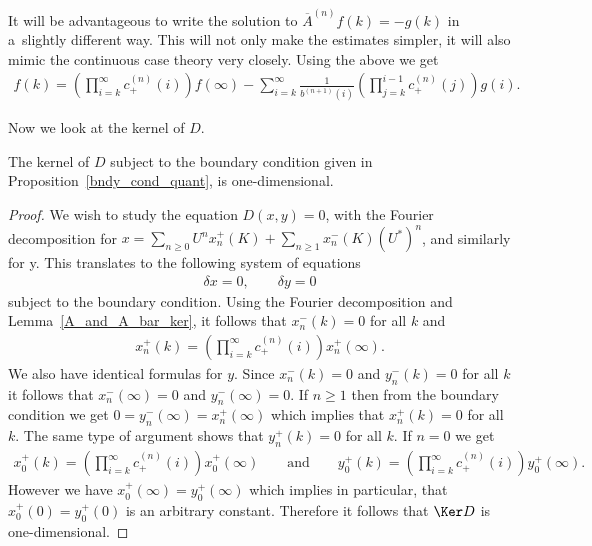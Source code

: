 It will be advantageous to write the solution to $\overline{A}^{(n)}f(k) = -g(k)$ in a~slightly dif\/ferent way.
This will not only make the estimates simpler, it will also mimic the continuous case theory very closely.
Using the above we get
\begin{gather*}
f(k) = \left(\prod\limits_{i=k}^\infty c_+^{(n)}(i)\right)f(\infty) - \sum\limits_{i=k}^\infty
\frac{1}{b^{(n+1)}(i)}\left(\prod\limits_{j=k}^{i-1}c_+^{(n)}(j)\right)g(i).
\end{gather*}

Now we look at the kernel of $D$.

\begin{prop}
The kernel of $D$ subject to the boundary condition given in Proposition~{\rm \ref{bndy_cond_quant}}, is one-dimensional.
\end{prop}

\begin{proof}
We wish to study the equation $D(x,y) = 0$, with the Fourier decomposition for $x= \sum\limits_{n\ge0} U^n x_n^+(K) +
\sum\limits_{n\ge1} x_n^-(K)(U^*)^n$, and similarly for y.
This translates to the following system of equations
\begin{gather*}
\delta x = 0,
\qquad
\delta y = 0
\end{gather*}
subject to the boundary condition.
Using the Fourier decomposition and Lemma~\ref{A_and_A_bar_ker}, it follows that $x_n^-(k) = 0$ for all $k$ and
\begin{gather*}
x_n^+(k) = \left(\prod\limits_{i=k}^\infty c_+^{(n)}(i)\right)x_n^+(\infty).
\end{gather*}
We also have identical formulas for $y$.
Since $x_n^-(k) = 0$ and $y_n^-(k) = 0$ for all $k$ it follows that $x_n^-(\infty)=0$ and $y_n^-(\infty)= 0$.
If $n\ge1$ then from the boundary condition we get $0 = y_n^-(\infty) = x_n^+(\infty)$ which implies that $x_n^+(k)=0$
for all $k$.
The same type of argument shows that $y_n^+(k)=0$ for all $k$.
If $n=0$ we get
\begin{gather*}
x_0^+(k) = \left(\prod\limits_{i=k}^\infty c_+^{(n)}(i)\right)x_0^+(\infty)
\qquad
\textrm{and}
\qquad
y_0^+(k) = \left(\prod\limits_{i=k}^\infty c_+^{(n)}(i)\right)y_0^+(\infty).
\end{gather*}
However we have $x_0^+(\infty) = y_0^+(\infty)$ which implies in particular, that $x_0^+(0) = y_0^+(0)$ is an arbitrary
constant.
Therefore it follows that $\Ker D$ is one-dimensional.
\end{proof}

